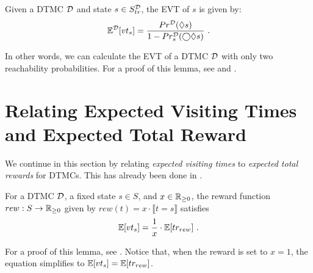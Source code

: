 \begin{lemma}\label{lem:EVT_via_quant_reach}
    Given a DTMC $\mathcal{D}$ and state $s\in S^{\mathcal{D}}_{tr}$, the EVT of $s$ is given by:
    \[ \Exp^\MC[vt_s] = \frac{Pr^{\MC}(\lozenge s)}{1-Pr^{\MC}_{s}(\cCircle\lozenge s)}\ .\]
\end{lemma}

In other words, we can calculate the EVT of a DTMC $\mathcal{D}$ with only two reachability probabilities. For a proof of this lemma, see \cite[Lemma 3.5]{Baier_Relating_Reach_Prob} and \cite[Lemma 5.1]{Computing_EVTs_Stationary_Distr_in_MCs_Mertens}.

\section{Relating Expected Visiting Times and Expected Total Reward}\label{sec:MC_Total_Reward}
We continue in this section by relating \textit{expected visiting times} to \textit{expected total rewards} for DTMCs. This has already been done in \cite{Computing_EVTs_Stationary_Distr_in_MCs_Mertens}.

\begin{lemma}\label{lem:from-expected-rewards-to-evts}
    For a DTMC $\mathcal{D}$, a fixed state $s\in S$, and $x\in \mathbb{R}_{\geq 0}$, the reward function \\$rew: S \rightarrow \mathbb{R}_{\geq 0}$ given by $rew(t) = x \cdot \llbracket t = s\rrbracket$ satisfies
    \[\mathbb{E}[vt_s] = \frac{1}{x}\cdot \mathbb{E}[tr_{rew}]\ .\]
\end{lemma}
For a proof of this lemma, see \cite[Lemma 3.6]{Computing_EVTs_Stationary_Distr_in_MCs_Mertens}.
Notice that, when the reward is set to $x = 1$, the equation simplifies to $\mathbb{E}[vt_s] = \mathbb{E}[tr_{rew}]$.

